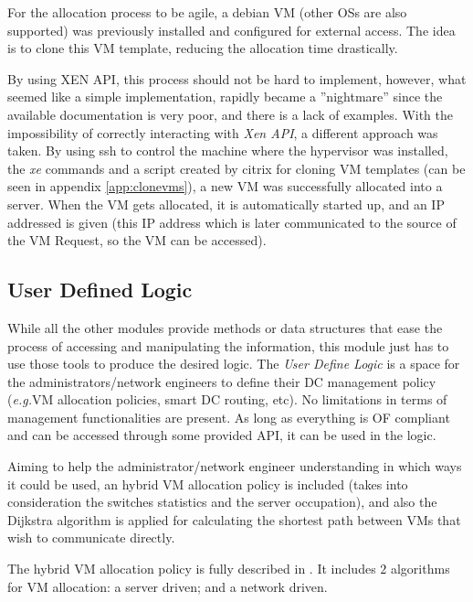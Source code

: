 \documentclass[12pt,english,oneside]{book}
\begin{document}
For the allocation process to be agile, a debian VM (other OSs are also supported) was previously installed and configured for external access. The idea is to clone this VM template, reducing the allocation time drastically.

By using XEN API, this process should not be hard to implement, however, what seemed like a simple implementation, rapidly became a ''nightmare'' since the available documentation is very poor, and there is a lack of examples.
With the impossibility of correctly interacting with \textit{Xen API}, a different approach was taken. By using ssh to control the machine where the hypervisor was installed, the \textit{xe} commands and a script created by citrix for cloning VM templates (can be seen in appendix \ref{app:clonevms}), a new VM was successfully allocated into a server.
When the VM gets allocated, it is automatically started up, and an IP addressed is given (this IP address which is later communicated to the source of the VM Request, so the VM can be accessed).

\subsection{User Defined Logic}
\label{subsec:userdeflog}
\hspace{0.6cm}

While all the other modules provide methods or data structures that ease the process of accessing and manipulating the information, this module just has to use those tools to produce the desired logic.
The \textit{User Define Logic} is a space for the administrators/network engineers to define their DC management policy (\textit{e.g.}VM allocation policies, smart DC routing, etc).
No limitations in terms of management functionalities are present. As long as everything is OF compliant and can be accessed through some provided API, it can be used in the logic.

Aiming to help the administrator/network engineer understanding in which ways it could be used, an hybrid VM allocation policy is included (takes into consideration the switches statistics and the server occupation), and also the Dijkstra algorithm is applied for calculating the shortest path between VMs that wish to communicate directly.

The hybrid VM allocation policy is fully described in \cite{im2013}. It includes $2$ algorithms for VM allocation: a server driven; and a network driven.
\end{document}
